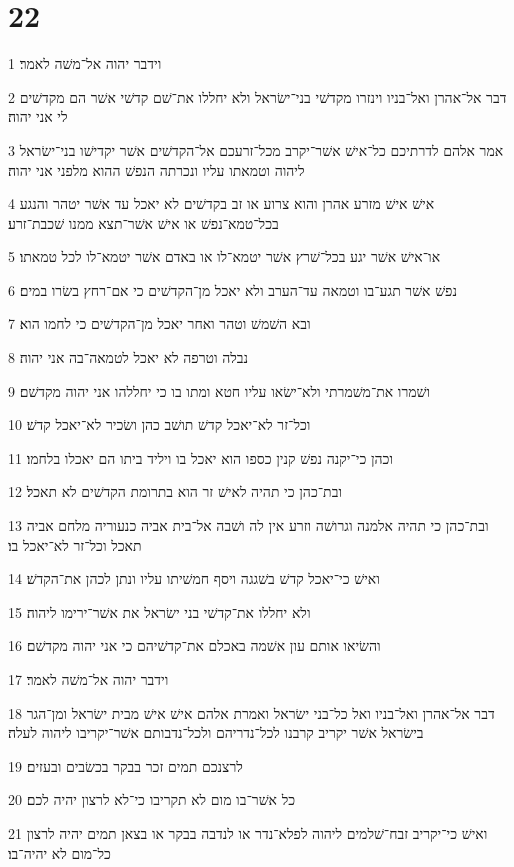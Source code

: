 \chapter{22}

\par 1 וידבר יהוה אל־משׁה לאמר׃
\par 2 דבר אל־אהרן ואל־בניו וינזרו מקדשׁי בני־ישׂראל ולא יחללו את־שׁם קדשׁי אשׁר הם מקדשׁים לי אני יהוה׃
\par 3 אמר אלהם לדרתיכם כל־אישׁ אשׁר־יקרב מכל־זרעכם אל־הקדשׁים אשׁר יקדישׁו בני־ישׂראל ליהוה וטמאתו עליו ונכרתה הנפשׁ ההוא מלפני אני יהוה׃
\par 4 אישׁ אישׁ מזרע אהרן והוא צרוע או זב בקדשׁים לא יאכל עד אשׁר יטהר והנגע בכל־טמא־נפשׁ או אישׁ אשׁר־תצא ממנו שׁכבת־זרע׃
\par 5 או־אישׁ אשׁר יגע בכל־שׁרץ אשׁר יטמא־לו או באדם אשׁר יטמא־לו לכל טמאתו׃
\par 6 נפשׁ אשׁר תגע־בו וטמאה עד־הערב ולא יאכל מן־הקדשׁים כי אם־רחץ בשׂרו במים׃
\par 7 ובא השׁמשׁ וטהר ואחר יאכל מן־הקדשׁים כי לחמו הוא׃
\par 8 נבלה וטרפה לא יאכל לטמאה־בה אני יהוה׃
\par 9 ושׁמרו את־משׁמרתי ולא־ישׂאו עליו חטא ומתו בו כי יחללהו אני יהוה מקדשׁם׃
\par 10 וכל־זר לא־יאכל קדשׁ תושׁב כהן ושׂכיר לא־יאכל קדשׁ׃
\par 11 וכהן כי־יקנה נפשׁ קנין כספו הוא יאכל בו ויליד ביתו הם יאכלו בלחמו׃
\par 12 ובת־כהן כי תהיה לאישׁ זר הוא בתרומת הקדשׁים לא תאכל׃
\par 13 ובת־כהן כי תהיה אלמנה וגרושׁה וזרע אין לה ושׁבה אל־בית אביה כנעוריה מלחם אביה תאכל וכל־זר לא־יאכל בו׃
\par 14 ואישׁ כי־יאכל קדשׁ בשׁגגה ויסף חמשׁיתו עליו ונתן לכהן את־הקדשׁ׃
\par 15 ולא יחללו את־קדשׁי בני ישׂראל את אשׁר־ירימו ליהוה׃
\par 16 והשׂיאו אותם עון אשׁמה באכלם את־קדשׁיהם כי אני יהוה מקדשׁם׃
\par 17 וידבר יהוה אל־משׁה לאמר׃
\par 18 דבר אל־אהרן ואל־בניו ואל כל־בני ישׂראל ואמרת אלהם אישׁ אישׁ מבית ישׂראל ומן־הגר בישׂראל אשׁר יקריב קרבנו לכל־נדריהם ולכל־נדבותם אשׁר־יקריבו ליהוה לעלה׃
\par 19 לרצנכם תמים זכר בבקר בכשׂבים ובעזים׃
\par 20 כל אשׁר־בו מום לא תקריבו כי־לא לרצון יהיה לכם׃
\par 21 ואישׁ כי־יקריב זבח־שׁלמים ליהוה לפלא־נדר או לנדבה בבקר או בצאן תמים יהיה לרצון כל־מום לא יהיה־בו׃

